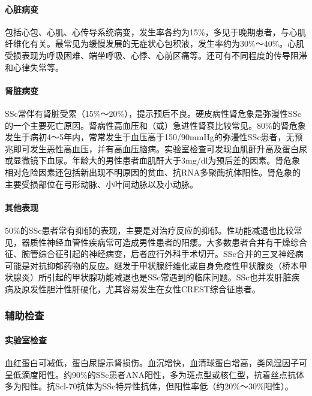 \paragraph{心脏病变}

包括心包、心肌、心传导系统病变，发生率各约为15\%，多见于晚期患者，与心肌纤维化有关。最常见为缓慢发展的无症状心包积液，发生率约为30\%～40\%。心肌受损表现为呼吸困难、端坐呼吸、心悸、心前区痛等。还可有不同程度的传导阻滞和心律失常等。

\paragraph{肾脏病变}

SSc常伴有肾脏受累（15\%～20\%），提示预后不良。硬皮病性肾危象是弥漫性SSc的一个主要死亡原因。肾病性高血压和（或）急进性肾衰比较常见。80\%的肾危象发生于病初4～5年内，常常发生于血压高于150/90mmHg的弥漫性SSc患者，无预兆即可发生恶性高血压，并有高血压脑病。实验室检查可发现血肌酐升高及蛋白尿或显微镜下血尿。年龄大的男性患者血肌酐大于3mg/dl为预后差的因素。肾危象相对危险因素还包括新出现不明原因的贫血、抗RNA多聚酶抗体阳性。肾危象的主要受损部位在弓形动脉、小叶间动脉以及小动脉。

\paragraph{其他表现}

50\%的SSc患者常有抑郁的表现，主要是对治疗反应的抑郁。性功能减退也比较常见，器质性神经血管性疾病常可造成男性患者的阳痿。大多数患者合并有干燥综合征、腕管综合征引起的神经病变，后者应行外科手术切开。SSc合并的三叉神经病可能是对抗抑郁药物的反应。继发于甲状腺纤维化或自身免疫性甲状腺炎（桥本甲状腺炎）所引起的甲状腺功能减退也是SSc常遇到的临床问题。SSc也并发肝脏疾病及原发性胆汁性肝硬化，尤其容易发生在女性CREST综合征患者。

\subsubsection{辅助检查}

\paragraph{实验室检查}

血红蛋白可减低，蛋白尿提示肾损伤。血沉增快，血清球蛋白增高，类风湿因子可呈低滴度阳性。约90\%的SSc患者ANA阳性，多为斑点型或核仁型，抗着丝点抗体多为阳性。抗Scl-70抗体为SSc特异性抗体，但阳性率低（约20\%～30\%阳性）。

